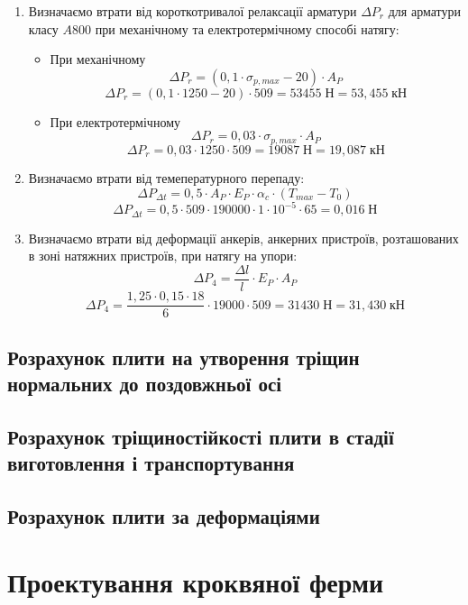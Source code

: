\documentclass[a4paper,14pt]{article}
\begin{document}
\begin{enumerate}
    \item Визначаємо втрати від короткотривалої релаксації арматури $\Delta P_r$ для арматури класу $A800$ при механічному та електротермічному способі натягу:
        \begin{itemize}
            \item При механічному
                \begin{equation}
                    \Delta P_r = (0,1 \cdot \sigma_{p,max} - 20) \cdot A_P
                \end{equation}
                $$\Delta P_r = (0,1 \cdot 1250 - 20) \cdot 509 = 53455\;\textit{Н} = 53,455\;\textit{кН}$$
            \item При електротермічному
                \begin{equation}
                    \Delta P_r = 0,03 \cdot \sigma_{p,max} \cdot A_P
                \end{equation}
                $$\Delta P_r = 0,03 \cdot 1250 \cdot 509 = 19087\;\textit{Н} = 19,087\;\textit{кН}$$
        \end{itemize}
    \item Визначаємо втрати від темепературного перепаду:
        \begin{equation}
            \Delta P_{\Delta t} = 0,5 \cdot A_P \cdot E_P \cdot \alpha_c \cdot (T_{max} - T_0)
        \end{equation}
        $$\Delta P_{\Delta t} = 0,5 \cdot 509 \cdot 190000 \cdot 1 \cdot 10^{-5} \cdot 65 = 0,016\;\textit{Н}$$
    \item Визначаємо втрати від деформації анкерів, анкерних пристроїв, розташованих в зоні натяжних пристроїв, при натягу на упори:
        \begin{equation}
            \Delta P_4 = \dfrac{\Delta l}{l} \cdot E_P \cdot A_P
        \end{equation}
        $$\Delta P_4 = \dfrac{1,25 \cdot 0,15 \cdot 18}{6} \cdot 19000 \cdot 509 = 31430\;\textit{Н} = 31,430\;\textit{кН}$$
\end{enumerate}
\subsection{Розрахунок плити на утворення тріщин нормальних до поздовжньої осі}
\subsection{Розрахунок тріщиностійкості плити в стадії виготовлення і транспортування}
\subsection{Розрахунок плити за деформаціями}

\newpage
\section{Проектування кроквяної ферми}
\end{document}
